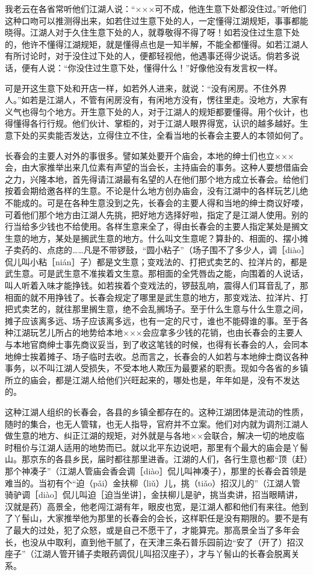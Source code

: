 \documentclass[12pt,UTF8]{ctexbook}
\begin{document}
我老云在各省常听他们江湖人说：“×××可不成，他连生意下处都没住过。”听他们这种口吻可以推测得出来，如若住过生意下处的人，一定懂得江湖规矩，事事都能晓得。江湖人对于久住生意下处的人，就尊敬得不得了呀！如若没住过生意下处的，他许不懂得江湖规矩，就是懂得点也是一知半解，不能全都懂得。如若江湖人有所讨论时，对于没住过下处的人，便都轻视他，他遇事还得少说话。倘若多说话，便有人说：“你没住过生意下处，懂得什么！”好像他没有发言权一样。

可是开这生意下处和开店一样，如若外人进来，就说：“没有闲房。不住外界人。”如若是江湖人，不管有闲房没有，有闲地方没有，愣往里走。没地方，大家有义气也得匀个地方。开生意下处的人，对于江湖人的规矩都要懂得。用个伙计，也得懂得各行行规。他们伙计、掌柜的，对于江湖人眼界得宽，认识的越多越好。生意下处的买卖能否发达，立得住立不住，全看当地的长春会主要人的本领如何了。

长春会的主要人对外的事很多。譬如某处要开个庙会，本地的绅士们也立×××会，由大家推举出来几位素有声望的当会长，主持庙会的事务。这种人要想借庙会之力，兴隆本地，首先得请江湖最有名望的人在他们那个地方成立长春会。给他们按着会期给邀各样的生意。不论是什么地方创办庙会，没有江湖中的各样玩艺儿绝不能成的。可是在各种生意没到之先，长春会的主要人得和当地的绅士商议好喽，可着他们那个地方由江湖人先挑，把好地方选择好啦，指定了是江湖人使用。别的行当给多少钱也不给使用。各样生意来全了，得由长春会的主要人指定某处是搁文生意的地方，某处是搁武生意的地方。什么叫文生意呢？算卦的、相面的、摆小摊子卖药的、点痣的……凡是不带锣鼓，“圆小粘子”（场子围不了多少人，调［diào］侃儿叫小粘［nián］子）都是文生意；变戏法的、打把式卖艺的、拉洋片的，都是武生意。可是武生意不准挨着文生意。那相面的全凭唇齿之能，向围着的人说话，叫人听着入味才能挣钱。如若挨着个变戏法的，锣鼓乱响，震得人们耳音乱了，那相面的就不用挣钱了。长春会规定了哪里是武生意的地方，那变戏法、拉洋片、打把式卖艺的，就往那里搁生意，绝不会乱搁场子。至于什么生意与什么生意之间，摊子应该离多远、场子应该离多远，也有一定的尺寸，谁也不能碍谁的事。至于各种江湖玩艺儿所占的地势给本地×××会应拿多少钱的花销，也由长春会的主要人与本地官商绅士事先商议妥当，到了收这笔钱的时候，也得有长春会的人，会同本地绅士挨着摊子、场子临时去收。总而言之，长春会的人如若与本地绅士商议各种事务，以不叫江湖人受损失，不受本地人欺压为最要紧的职责。现如今各省的乡镇所立的庙会，都是江湖人给他们兴旺起来的，哪处也是，年年如是，没有不发达的。

这种江湖人组织的长春会，各县的乡镇全都存在的。这种江湖团体是流动的性质，随时的集合，也无人管辖，也无人指导，官府并不立案。他们对内就为调剂江湖人做生意的地方、纠正江湖的规矩，对外就是与各地××会联合，解决一切的地皮临时租价与江湖人适用的地势而已。就以北平东边说吧，那里有个最大的庙会是丫髻山。那京东的各县乡民，届时都往那里进香。江湖的人们，各行生意也都“顶（赶）那个神凑子”（江湖人管庙会香会调［diào］侃儿叫神凑子），那里的长春会首领是难当的。当初有个“迫（pǎi）金扶柳（liǔ）儿，挑（tiǎo）招汉儿的”（江湖人管骑驴调［diào］侃儿叫迫［迫当坐讲］，金扶柳儿是驴，挑当卖讲，招当眼睛讲，汉就是药）高景全，他老闯江湖有年，眼皮也宽，是江湖人都和他们有来往。他到了丫髻山，大家推举他为那里的长春会的会长，这样职任是没有期限的。要不是有了最大的过处，犯了众怒，或是自己不愿干了，才能算完。那高景全当了多年会长，也没从中取利，直到他干腻了，在天津三条石普乐园前边“安了（开了）招汉座子”（江湖人管开铺子卖眼药调侃儿叫招汉座子），才与丫髻山的长春会脱离关系。
\end{document}
